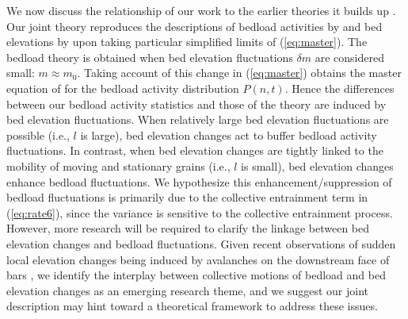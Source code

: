 \documentclass[draft]{agujournal2018}
\begin{document}
We now discuss the relationship of our work to the earlier theories it builds up \citep[e.g.][]{Ancey2008, Martin2014}.
Our joint theory reproduces the descriptions of bedload activities by \citet{Ancey2008} and bed elevations by \citet{Martin2014} upon taking particular simplified limits of (\ref{eq:master}).
The \citet{Ancey2008} bedload theory is obtained when bed elevation fluctuations $\delta m$ are considered small: $m \approx m_0$.
Taking account of this change in (\ref{eq:master}) obtains the master equation of \citet{Ancey2008} for the bedload activity distribution $P(n,t)$.
Hence the differences between our bedload activity statistics and those of the \citet{Ancey2008} theory are induced by bed elevation fluctuations.
When relatively large bed elevation fluctuations are possible (i.e., $l$ is large), bed elevation changes act to buffer bedload activity fluctuations.
In contrast, when bed elevation changes are tightly linked to the mobility of moving and stationary grains (i.e., $l$ is small), bed elevation changes enhance bedload fluctuations.
We hypothesize this enhancement/suppression of bedload fluctuations is primarily due to the collective entrainment term in (\ref{eq:rate6}), since the \citet{Ancey2008} variance is sensitive to the collective entrainment process.
However, more research will be required to clarify the linkage between bed elevation changes and bedload fluctuations.
Given recent observations of sudden local elevation changes being induced by avalanches on the downstream face of bars \citep{Dhont2018}, we identify the interplay between collective motions of bedload and bed elevation changes as an emerging research theme, and we suggest our joint description may hint toward a theoretical framework to address these issues.
\end{document}
